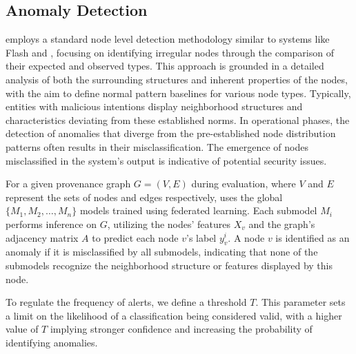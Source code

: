\subsection{Anomaly Detection}
\label{sys:anomaly_detection}

\Sys employs a standard node level detection methodology similar to systems like Flash and \threatrace, focusing on identifying irregular nodes through the comparison of their expected and observed types. This approach is grounded in a detailed analysis of both the surrounding structures and inherent properties of the nodes, with the aim to define normal pattern baselines for various node types. Typically, entities with malicious intentions display neighborhood structures and characteristics deviating from these established norms. In operational phases, the detection of anomalies that diverge from the pre-established node distribution patterns often results in their misclassification. The emergence of nodes misclassified in the system's output is indicative of potential security issues.

For a given provenance graph \(G = (V, E)\) during evaluation, where \(V\) and \(E\) represent the sets of nodes and edges respectively, \Sys uses the global \(\{M_1, M_2, \ldots, M_n\}\) \gnnshort models trained using federated learning. Each submodel \(M_i\) performs inference on \(G\), utilizing the nodes' features \(X_v\) and the graph's adjacency matrix \(A\) to predict each node \(v\)'s label \(y_v^i\). A node \(v\) is identified as an anomaly if it is misclassified by all submodels, indicating that none of the submodels recognize the neighborhood structure or features displayed by this node. 

To regulate the frequency of alerts, we define a threshold \(T\). This parameter sets a limit on the likelihood of a classification being considered valid, with a higher value of \(T\) implying stronger confidence and increasing the probability of identifying anomalies. 